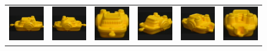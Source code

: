 \begin{figure}[p]
\begin{center}
\begin{tabular}{cccccc}
\includegraphics[width=2cm]{coil/beeld-12.eps} &
\includegraphics[width=2cm]{coil/beeld-13.eps} &
\includegraphics[width=2cm]{coil/beeld-14.eps} &
\includegraphics[width=2cm]{coil/beeld-15.eps} &
\includegraphics[width=2cm]{coil/beeld-16.eps} &
\includegraphics[width=2cm]{coil/beeld-17.eps} \\


\end{tabular}
\end{center}
\end{figure}
